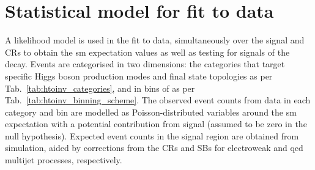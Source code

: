 \section{Statistical model for fit to data}
\label{sec:htoinv_satistical_treatment}

A likelihood model is used in the fit to data, simultaneously over the signal and \glspl{CR} to obtain the \acrlong{sm} expectation values as well as testing for signals of the \higgstoinv decay. Events are categorised in two dimensions: the categories that target specific Higgs boson production modes and final state topologies as per Tab.~\ref{tab:htoinv_categories}, and in bins of \ptmiss as per Tab.~\ref{tab:htoinv_binning_scheme}. The observed event counts from data in each category and \ptmiss bin are modelled as Poisson-distributed variables around the \acrshort{sm} expectation with a potential contribution from signal (assumed to be zero in the null hypothesis). Expected event counts in the signal region are obtained from simulation, aided by corrections from the \glspl{CR} and \glspl{SB} for electroweak and \acrshort{qcd} multijet processes, respectively.

